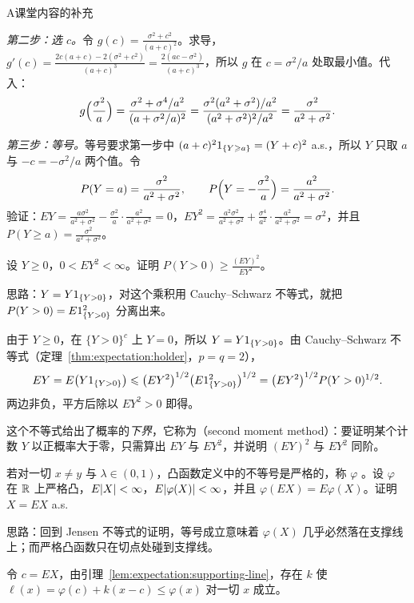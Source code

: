 \begin{exercises}{A}{课堂内容的补充}
\begin{solution}
\emph{第二步：选 $c$。}令 $g(c)=\frac{\sigma^2+c^2}{(a+c)^2}$。求导，$g'(c)=\frac{2c(a+c)-2(\sigma^2+c^2)}{(a+c)^3}=\frac{2(ac-\sigma^2)}{(a+c)^3}$，所以 $g$ 在 $c=\sigma^2/a$ 处取最小值。代入：
\[
g\Bigl(\frac{\sigma^2}a\Bigr)=\frac{\sigma^2+\sigma^4/a^2}{(a+\sigma^2/a)^2}=\frac{\sigma^2(a^2+\sigma^2)/a^2}{(a^2+\sigma^2)^2/a^2}=\frac{\sigma^2}{a^2+\sigma^2}.
\]

\emph{第三步：等号。}等号要求第一步中 $(a+c)^21_{\{Y\geqslant a\}}=(Y+c)^2$ a.s.，所以 $Y$ 只取 $a$ 与 $-c=-\sigma^2/a$ 两个值。令
\[
P(Y=a)=\frac{\sigma^2}{a^2+\sigma^2},\qquad P\Bigl(Y=-\frac{\sigma^2}a\Bigr)=\frac{a^2}{a^2+\sigma^2}.
\]
验证：$EY=\frac{a\sigma^2}{a^2+\sigma^2}-\frac{\sigma^2}a\cdot\frac{a^2}{a^2+\sigma^2}=0$，$EY^2=\frac{a^2\sigma^2}{a^2+\sigma^2}+\frac{\sigma^4}{a^2}\cdot\frac{a^2}{a^2+\sigma^2}=\sigma^2$，并且 $P(Y\geqslant a)=\frac{\sigma^2}{a^2+\sigma^2}$。
\end{solution}

\item\label{ex:expectation:A5} 设 $Y\geqslant0$，$0<EY^2<\infty$。证明 $P(Y>0)\geqslant\frac{(EY)^2}{EY^2}$。
\begin{solution}
思路：$Y=Y1_{\{Y>0\}}$，对这个乘积用 Cauchy--Schwarz 不等式，就把 $P(Y>0)=E1_{\{Y>0\}}^2$ 分离出来。

由于 $Y\geqslant0$，在 $\{Y>0\}^c$ 上 $Y=0$，所以 $Y=Y1_{\{Y>0\}}$。由 Cauchy--Schwarz 不等式（定理~\ref{thm:expectation:holder}，$p=q=2$），
\[
EY=E\bigl(Y1_{\{Y>0\}}\bigr)\leqslant\bigl(EY^2\bigr)^{1/2}\bigl(E1_{\{Y>0\}}^2\bigr)^{1/2}=\bigl(EY^2\bigr)^{1/2}P(Y>0)^{1/2}.
\]
两边非负，平方后除以 $EY^2>0$ 即得。

这个不等式给出了概率的\emph{下界}，它称为（second moment method）：要证明某个计数 $Y$ 以正概率大于零，只需算出 $EY$ 与 $EY^2$，并说明 $(EY)^2$ 与 $EY^2$ 同阶。
\end{solution}

\item\label{ex:expectation:A6} 若对一切 $x\neq y$ 与 $\lambda\in(0,1)$，凸函数定义中的不等号是严格的，称 $\varphi$ 。设 $\varphi$ 在 $\mathbb{R}$ 上严格凸，$E\lvert X\rvert<\infty$，$E\lvert \varphi(X)\rvert<\infty$，并且 $\varphi(EX)=E\varphi(X)$。证明 $X=EX$ a.s.
\begin{solution}
思路：回到 Jensen 不等式的证明，等号成立意味着 $\varphi(X)$ 几乎必然落在支撑线上；而严格凸函数只在切点处碰到支撑线。

令 $c=EX$，由引理~\ref{lem:expectation:supporting-line}，存在 $k$ 使 $\ell(x)=\varphi(c)+k(x-c)\leqslant\varphi(x)$ 对一切 $x$ 成立。


\end{solution}
\end{exercises}
